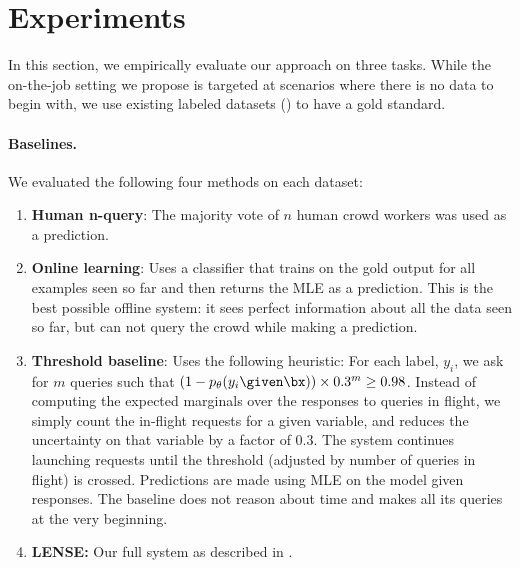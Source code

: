\section{Experiments}
\label{sec:experiments}


In this section, we empirically evaluate our approach on three tasks. 
While the on-the-job setting we propose is targeted at scenarios where there is
no data to begin with, we use existing labeled datasets () to have a gold standard.

\paragraph{Baselines.}
We evaluated the following four methods on each dataset:
\begin{enumerate}
  \item {\bf Human n-query}: The majority vote of $n$ human crowd workers was used as a prediction.
  \item {\bf Online learning}:
    Uses a classifier that trains on the gold output for all examples seen so
    far and then returns the MLE as a prediction.
    This is the best possible offline system: it sees perfect information about all the data seen so far, but can not query the crowd while making a prediction.
  \item {\bf Threshold baseline}: Uses the following heuristic:
    For each label, $y_i$, we ask for $m$ queries such that $(1 - \p(y_i\given \bx))\times 0.3^m \ge 0.98$. %
    Instead of computing the expected marginals over the responses to queries in flight,
    we simply count the in-flight requests for a given variable, and reduces
    the uncertainty on that variable by a factor of $0.3$. The system continues
    launching requests until the threshold (adjusted by number of queries in
    flight) is crossed. Predictions are made using MLE on the model given
    responses.
    The baseline does not reason about time and makes all its queries at the very beginning.
  \item {\bf LENSE:} Our full system as described in .
\end{enumerate}

